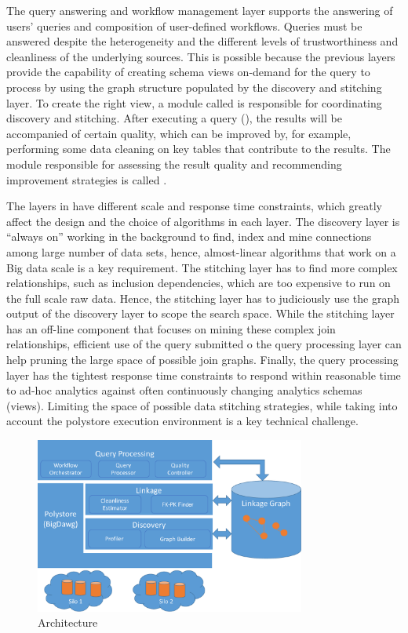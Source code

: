 The query answering and workflow management layer 
supports the answering of users' queries and composition of user-defined workflows.
Queries must be answered despite the heterogeneity and the different levels of
trustworthiness and cleanliness of the underlying sources. This is possible
because the previous layers provide the capability of creating schema views
on-demand for the query to process by using the graph structure populated by
the discovery and stitching layer. To create the right view, a module
called  is responsible for coordinating discovery
and stitching. After executing a query (), the results will
be accompanied of certain quality, which can be improved by, for example,
performing some data cleaning on key tables that contribute to the results. The
module responsible for assessing the result quality and recommending improvement
strategies is called .

The  layers in \dcv have different scale and response time constraints,
which greatly affect the design and the choice of algorithms in each layer. 
The discovery layer is ``always on'' working in the background to find, index and
mine connections among large number of data sets, hence, almost-linear
algorithms that work on a Big data scale is a key requirement. 
The stitching layer has to find more complex
relationships, such as inclusion dependencies, which are too expensive to run on
the full scale raw data. Hence, the stitching layer has to judiciously use the
graph output of the discovery layer to scope the search space. While the stitching
layer has an off-line component that focuses on mining these complex join
relationships, efficient use of the query submitted o the query processing layer
can help pruning the large space of possible join graphs. 
Finally, the query processing layer has the tightest response time constraints to respond
within reasonable time to ad-hoc analytics against often continuously changing
analytics schemas (views). Limiting the space of possible data stitching
strategies, while taking into account the polystore execution environment is a
key technical challenge. 

\begin{figure}
\includegraphics[width=3.5in]{arch3.pdf}
\caption{\dcv Architecture}
\label{fig:arch}
\end{figure}

